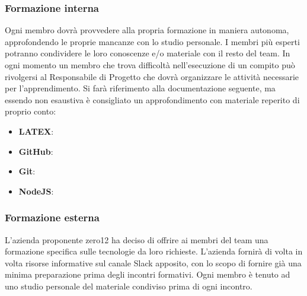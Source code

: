 \subsubsection{Formazione interna}
Ogni membro dovrà provvedere alla propria formazione in maniera autonoma, approfondendo le proprie mancanze con lo studio personale. I membri più esperti potranno condividere le loro conoscenze e/o materiale con il resto del team. In ogni momento un membro che trova difficoltà nell'esecuzione di un compito può rivolgersi al Responsabile di Progetto che dovrà organizzare le attività necessarie per l'apprendimento. Si farà riferimento alla documentazione seguente, ma essendo non esaustiva è consigliato un approfondimento con materiale reperito di proprio conto:
\begin{itemize}
\item \textbf{LATEX}:
\item \textbf{GitHub}:
\item \textbf{Git}:
\item \textbf{NodeJS}:
\end{itemize}

\subsubsection{Formazione esterna}
L'azienda proponente zero12 ha deciso di offrire ai membri del team una formazione specifica sulle tecnologie da loro richieste. L'azienda fornirà di volta in volta risorse informative sul canale Slack apposito, con lo scopo di fornire già una minima preparazione prima degli incontri formativi. Ogni membro è tenuto ad uno studio personale del materiale condiviso prima di ogni incontro.


